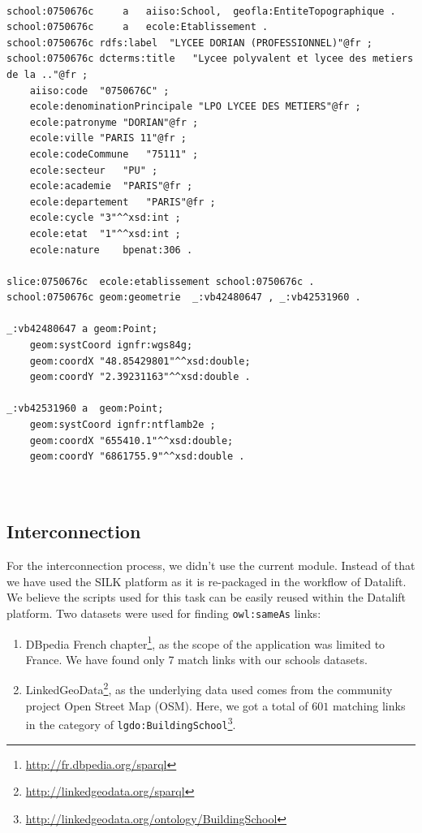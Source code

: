 \begin{lstlisting}

school:0750676c 	a	aiiso:School,  geofla:EntiteTopographique .
school:0750676c 	a	ecole:Etablissement .
school:0750676c	rdfs:label	"LYCEE DORIAN (PROFESSIONNEL)"@fr ;
school:0750676c	dcterms:title	"Lycee polyvalent et lycee des metiers de la .."@fr ;
	aiiso:code	"0750676C" ;
	ecole:denominationPrincipale "LPO LYCEE DES METIERS"@fr ;
	ecole:patronyme	"DORIAN"@fr ;
	ecole:ville	"PARIS 11"@fr ;
	ecole:codeCommune	"75111" ;
	ecole:secteur	"PU" ;
	ecole:academie	"PARIS"@fr ;
	ecole:departement	"PARIS"@fr ;
	ecole:cycle	"3"^^xsd:int ;
	ecole:etat	"1"^^xsd:int ;
	ecole:nature	bpenat:306 .

slice:0750676c	ecole:etablissement	school:0750676c .
school:0750676c	geom:geometrie	_:vb42480647 , _:vb42531960 .		

_:vb42480647 a geom:Point;
	geom:systCoord ignfr:wgs84g;
	geom:coordX "48.85429801"^^xsd:double;
	geom:coordY "2.39231163"^^xsd:double .

_:vb42531960 a  geom:Point;
	geom:systCoord ignfr:ntflamb2e ;
	geom:coordX "655410.1"^^xsd:double;
	geom:coordY "6861755.9"^^xsd:double .

	
\end{lstlisting}

\subsection{Interconnection}
For the interconnection process, we didn't use the current module. Instead of that we have used the SILK \cite{jentzsch2010silk} platform as it is re-packaged in the workflow of Datalift. We believe the scripts used for this task can be easily reused within the Datalift platform. Two datasets were used for finding \texttt{owl:sameAs} links:
\begin{enumerate}
\item DBpedia French chapter\footnote{\url{http://fr.dbpedia.org/sparql}}, as the scope of the application was limited to France. We have found only 7 match links with our schools datasets.
\item LinkedGeoData\footnote{\url{http://linkedgeodata.org/sparql}}, as the underlying data used comes from the community project Open Street Map (OSM). Here, we got  a total of $601$ matching links in the category of \texttt{lgdo:BuildingSchool}\footnote{\url{http://linkedgeodata.org/ontology/BuildingSchool}}.
\end{enumerate}


